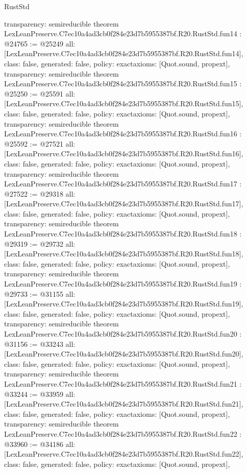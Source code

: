 \begin{lexlean}{RustStd}
\begin{coremodule}
{  transparency: semireducible
}
theorem LexLeanPreserve.C7ec10a4ad3cb0f284e23d7b5955387bf.R20.RustStd.fun14 : @24765 := @25249 {
  all: [LexLeanPreserve.C7ec10a4ad3cb0f284e23d7b5955387bf.R20.RustStd.fun14],
  class: false,
  generated: false,
  policy: exact{axioms: [Quot.sound, propext]},
  transparency: semireducible
}
theorem LexLeanPreserve.C7ec10a4ad3cb0f284e23d7b5955387bf.R20.RustStd.fun15 : @25250 := @25591 {
  all: [LexLeanPreserve.C7ec10a4ad3cb0f284e23d7b5955387bf.R20.RustStd.fun15],
  class: false,
  generated: false,
  policy: exact{axioms: [Quot.sound, propext]},
  transparency: semireducible
}
theorem LexLeanPreserve.C7ec10a4ad3cb0f284e23d7b5955387bf.R20.RustStd.fun16 : @25592 := @27521 {
  all: [LexLeanPreserve.C7ec10a4ad3cb0f284e23d7b5955387bf.R20.RustStd.fun16],
  class: false,
  generated: false,
  policy: exact{axioms: [Quot.sound, propext]},
  transparency: semireducible
}
theorem LexLeanPreserve.C7ec10a4ad3cb0f284e23d7b5955387bf.R20.RustStd.fun17 : @27522 := @29318 {
  all: [LexLeanPreserve.C7ec10a4ad3cb0f284e23d7b5955387bf.R20.RustStd.fun17],
  class: false,
  generated: false,
  policy: exact{axioms: [Quot.sound, propext]},
  transparency: semireducible
}
theorem LexLeanPreserve.C7ec10a4ad3cb0f284e23d7b5955387bf.R20.RustStd.fun18 : @29319 := @29732 {
  all: [LexLeanPreserve.C7ec10a4ad3cb0f284e23d7b5955387bf.R20.RustStd.fun18],
  class: false,
  generated: false,
  policy: exact{axioms: [Quot.sound, propext]},
  transparency: semireducible
}
theorem LexLeanPreserve.C7ec10a4ad3cb0f284e23d7b5955387bf.R20.RustStd.fun19 : @29733 := @31155 {
  all: [LexLeanPreserve.C7ec10a4ad3cb0f284e23d7b5955387bf.R20.RustStd.fun19],
  class: false,
  generated: false,
  policy: exact{axioms: [Quot.sound, propext]},
  transparency: semireducible
}
theorem LexLeanPreserve.C7ec10a4ad3cb0f284e23d7b5955387bf.R20.RustStd.fun20 : @31156 := @33243 {
  all: [LexLeanPreserve.C7ec10a4ad3cb0f284e23d7b5955387bf.R20.RustStd.fun20],
  class: false,
  generated: false,
  policy: exact{axioms: [Quot.sound, propext]},
  transparency: semireducible
}
theorem LexLeanPreserve.C7ec10a4ad3cb0f284e23d7b5955387bf.R20.RustStd.fun21 : @33244 := @33959 {
  all: [LexLeanPreserve.C7ec10a4ad3cb0f284e23d7b5955387bf.R20.RustStd.fun21],
  class: false,
  generated: false,
  policy: exact{axioms: [Quot.sound, propext]},
  transparency: semireducible
}
theorem LexLeanPreserve.C7ec10a4ad3cb0f284e23d7b5955387bf.R20.RustStd.fun22 : @33960 := @34186 {
  all: [LexLeanPreserve.C7ec10a4ad3cb0f284e23d7b5955387bf.R20.RustStd.fun22],
  class: false,
  generated: false,
  policy: exact{axioms: [Quot.sound, propext]},
}
\end{coremodule}
\end{lexlean}
